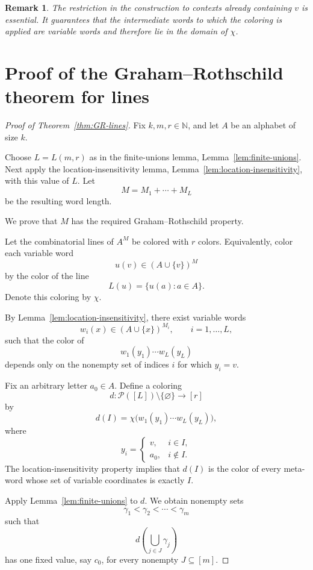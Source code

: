 \documentclass[11pt]{article}
\newtheorem{remark}[theorem]{Remark}
\newcommand{\N}{\mathbb N}
\newcommand{\Pow}{\mathcal P}
\begin{document}
\begin{remark}
  The restriction in the construction to contexts already containing
  \(v\) is essential. It guarantees that the intermediate words to
  which the coloring is applied are variable words and therefore lie in
  the domain of \(\chi\).
\end{remark}

\section{Proof of the Graham--Rothschild theorem for lines}

\begin{proof}[Proof of Theorem~\ref{thm:GR-lines}]
  Fix \(k,m,r\in\N\), and let \(A\) be an alphabet of size \(k\).

  Choose \(L=L(m,r)\) as in the finite-unions lemma,
  Lemma~\ref{lem:finite-unions}. Next apply the
  location-insensitivity lemma, Lemma~\ref{lem:location-insensitivity},
  with this value of \(L\). Let
  \[
    M=M_1+\cdots+M_L
  \]
  be the resulting word length.

  We prove that \(M\) has the required Graham--Rothschild property.

  Let the combinatorial lines of \(A^M\) be colored with \(r\) colors.
  Equivalently, color each variable word
  \[
    u(v)\in(A\cup\{v\})^M
  \]
  by the color of the line
  \[
    L(u)=\{u(a):a\in A\}.
  \]
  Denote this coloring by \(\chi\).

  By Lemma~\ref{lem:location-insensitivity}, there exist variable words
  \[
    w_i(x)\in(A\cup\{x\})^{M_i},
    \qquad i=1,\dots,L,
  \]
  such that the color of
  \[
    w_1(y_1)\cdots w_L(y_L)
  \]
  depends only on the nonempty set of indices \(i\) for which \(y_i=v\).

  Fix an arbitrary letter \(a_0\in A\). Define a coloring
  \[
    d:\Pow([L])\setminus\{\varnothing\}\longrightarrow[r]
  \]
  by
  \[
    d(I)
    =
    \chi\bigl(
      w_1(y_1)\cdots w_L(y_L)
    \bigr),
  \]
  where
  \[
    y_i=
    \begin{cases}
      v,& i\in I,\\
      a_0,& i\notin I.
    \end{cases}
  \]
  The location-insensitivity property implies that \(d(I)\) is the
  color of every meta-word whose set of variable coordinates is exactly
  \(I\).

  Apply Lemma~\ref{lem:finite-unions} to \(d\). We obtain nonempty sets
  \[
    \gamma_1<\gamma_2<\cdots<\gamma_m
  \]
  such that
  \[
    d\left(\bigcup_{j\in J}\gamma_j\right)
  \]
  has one fixed value, say \(c_0\), for every nonempty
  \(J\subseteq[m]\).


\end{proof}
\end{document}
